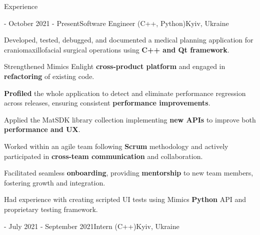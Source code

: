 \documentclass[11pt]{resume}
\begin{document}
    \hspace*{\fill}
    \hspace*{\fill}
    \hspace*{\fill}
    \hspace*{\fill}

    \begin{rSection}{Experience}
    	\begin{rSubsection}
            {\href{https://www.materialise.com/en}{\color{blue}\underline{}} - \href{https://www.materialise.com/en/healthcare/mimics-enlight-cmf}{\color{blue}\underline{}}}{October 2021 - Present}{Software Engineer (C++, Python)}{Kyiv, Ukraine}
            
            \item Developed, tested, debugged, and documented a medical planning application for craniomaxillofacial surgical operations using \textbf{C++ and Qt framework}.
            \item Strengthened Mimics Enlight \textbf{cross-product platform} and engaged in \textbf{refactoring} of existing code.
            \item \textbf{Profiled} the whole application to detect and eliminate performance regression across releases, ensuring consistent \textbf{performance improvements}.
    		\item Applied the MatSDK library collection implementing \textbf{new APIs} to improve both \textbf{performance and UX}.
            \item Worked within an agile team following \textbf{Scrum} methodology and actively participated in \textbf{cross-team communication} and collaboration.
            \item Facilitated seamless \textbf{onboarding}, providing \textbf{mentorship} to new team members, fostering growth and integration.
            \item Had experience with creating scripted UI tests using Mimics \textbf{Python} API and proprietary testing framework.
    	\end{rSubsection}

        \begin{rSubsection}
            {\href{https://www.materialise.com/en}{\color{blue}\underline{}} - \href{https://www.materialise.com/en/careers/students-graduates/internships}{\color{blue}\underline{}}}{July 2021 - September 2021}{Intern (C++)}{Kyiv, Ukraine}
            

\end{rSubsection}
\end{rSection}
\end{document}
